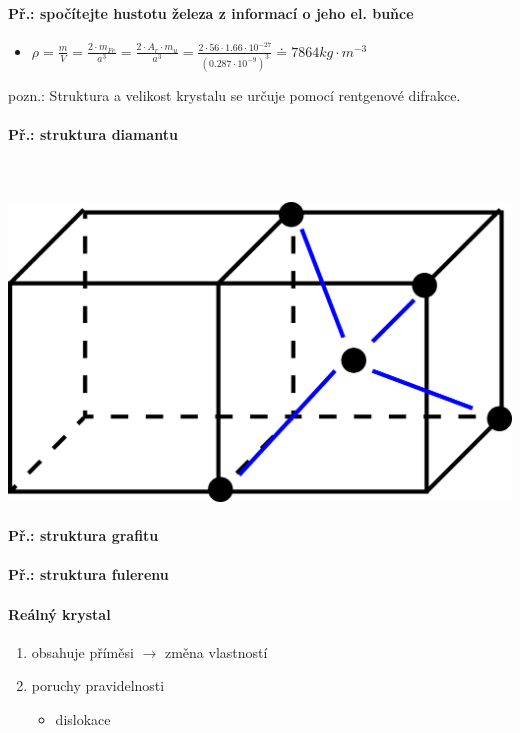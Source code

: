 \paragraph{Př.: spočítejte hustotu železa z informací o jeho el. buňce}
\begin{itemize}
\item $\rho = \frac{m}{V} = \frac{2 \cdot m_{Fe} }{a^3} = \frac{2 \cdot A_r \cdot m_u }{a^3} = \frac{2 \cdot 56 \cdot 1.66 \cdot 10^{-27}}{(0.287 \cdot 10^{-9})^3} \doteq 7864kg \cdot m^{-3} $
\end{itemize}
pozn.: Struktura a velikost krystalu se určuje pomocí rentgenové difrakce. 

\paragraph{Př.: struktura diamantu}\mbox{}\\ \mbox{} \\
\includegraphics[scale=0.5]{pictures/002.png}
\paragraph{Př.: struktura grafitu}

\paragraph{Př.: struktura fulerenu}

\paragraph{Reálný krystal}
\begin{enumerate}
\item obsahuje příměsi $\rightarrow$ změna vlastností
\item poruchy pravidelnosti
\begin{itemize}
\item dislokace
\end{itemize}
\end{enumerate}

